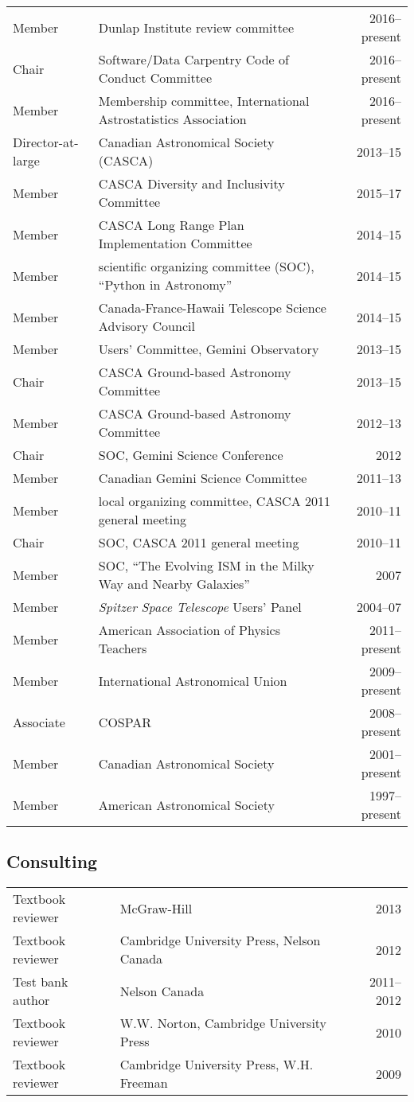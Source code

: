 \documentclass[12pt]{article}
\begin{document}
\vspace{0.5cm}
\begin{tabularx}{\textwidth}{lXr}
Member & Dunlap Institute review committee & 2016--present\\
Chair & Software/Data Carpentry Code of Conduct Committee & 2016--present\\
Member & Membership committee, International Astrostatistics Association & 2016--present\\
Director-at-large& Canadian Astronomical Society (CASCA)& 2013--15\\
Member& CASCA Diversity and Inclusivity Committee& 2015--17\\
Member& CASCA Long Range Plan Implementation Committee& 2014--15\\
Member& scientific organizing committee (SOC), ``Python in Astronomy'' & 2014--15\\
Member& Canada-France-Hawaii Telescope Science Advisory Council& 2014--15\\
Member&  Users' Committee, Gemini Observatory& 2013--15\\
Chair& CASCA Ground-based Astronomy Committee& 2013--15\\
Member& CASCA Ground-based Astronomy Committee& 2012--13\\
Chair& SOC, Gemini Science Conference& 2012\\
Member& Canadian Gemini Science Committee& 2011--13\\
Member& local organizing committee, CASCA 2011 general meeting&2010--11\\
Chair& SOC, CASCA 2011 general meeting&2010--11\\
Member& SOC, ``The Evolving ISM in the Milky Way and Nearby Galaxies'' & 2007\\
Member& {\it Spitzer Space Telescope} Users' Panel& 2004--07\\
Member& American Association of Physics Teachers& 2011--present\\
Member& International Astronomical Union& 2009--present\\
Associate& COSPAR& 2008--present\\
Member& Canadian Astronomical Society& 2001--present\\
Member& American Astronomical Society& 1997--present
\end{tabularx}

\subsection{Consulting}
\begin{tabularx}{\textwidth}{lXr}
Textbook reviewer& McGraw-Hill& 2013\\
Textbook reviewer & Cambridge University Press, Nelson Canada&2012\\
Test bank author& Nelson Canada& 2011--2012\\
Textbook reviewer& W.W. Norton, Cambridge University Press& 2010\\
Textbook reviewer& Cambridge University Press, W.H. Freeman& 2009
\end{tabularx}
\end{document}
